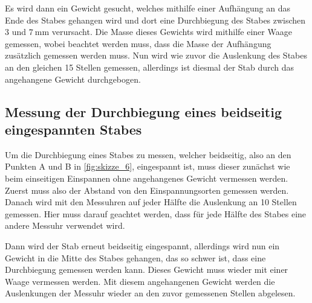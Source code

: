 Es wird dann ein Gewicht gesucht, welches mithilfe einer Aufhängung an das Ende des Stabes gehangen wird und dort eine Durchbiegung des Stabes zwischen $\num{3}$ und $\SI{7}{\milli\meter}$ verursacht.
Die Masse dieses Gewichts wird mithilfe einer Waage gemessen, wobei beachtet werden muss, dass die Masse der Aufhängung zusätzlich gemessen werden muss.
Nun wird wie zuvor die Auslenkung des Stabes an den gleichen 15 Stellen gemessen, allerdings ist diesmal der Stab durch das angehangene Gewicht durchgebogen. 

\subsection{Messung der Durchbiegung eines beidseitig eingespannten Stabes}
\label{sec:Durchführung_Beidseitig}

Um die Durchbiegung eines Stabes zu messen, welcher beidseitig, also an den Punkten A und B in \autoref{fig:skizze_6}, eingespannt ist, muss dieser zunächst wie beim einseitigen Einspannen ohne angehangenes Gewicht vermessen werden. Zuerst muss also der Abstand von den Einspannungsorten gemessen werden.
Danach wird mit den Messuhren auf jeder Hälfte die Auslenkung an 10 Stellen gemessen.
Hier muss darauf geachtet werden, dass für jede Hälfte des Stabes eine andere Messuhr verwendet wird.

Dann wird der Stab erneut beidseitig eingespannt, allerdings wird nun ein Gewicht in die Mitte des Stabes gehangen, das so schwer ist, dass eine Durchbiegung gemessen werden kann. 
Dieses Gewicht muss wieder mit einer Waage vermessen werden.
Mit diesem angehangenen Gewicht werden die Auslenkungen der Messuhr wieder an den zuvor gemessenen Stellen abgelesen.

